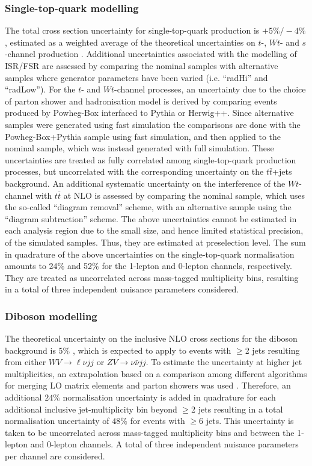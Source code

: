 \subsubsection{Single-top-quark modelling}
\label{sec:data:singletop}
The total cross section uncertainty for single-top-quark production is $+5\%/-4\%$, estimated as a weighted average of the theoretical uncertainties on $t$-, $Wt$- and $s$-channel production \cite{Kidonakis:2010ux,Kidonakis:2010tc,Kidonakis:2011wy}. Additional uncertainties associated with the modelling of ISR/FSR are assessed by comparing the nominal samples with alternative samples where generator parameters have been varied (i.e. ``radHi'' and ``radLow''). For the $t$- and $Wt$-channel processes, an uncertainty due to the choice of parton shower and hadronisation model is derived by comparing events produced by {\sc Powheg-Box} interfaced to {\sc Pythia} or {\sc Herwig++}. Since alternative samples were generated using fast simulation the comparisons are done with the {\sc Powheg-Box+Pythia} sample using fast simulation, and then applied to the nominal sample, which was instead generated with full simulation. These uncertainties are treated as fully correlated among single-top-quark production processes, but uncorrelated with the corresponding uncertainty on the $t\bar{t}$+jets background.
An additional systematic uncertainty on the interference of the $Wt$-channel with $t\bar{t}$ at NLO \cite{singletopDR} is assessed by comparing the nominal sample, which uses the so-called ``diagram removal'' scheme, with an alternative sample using the ``diagram subtraction'' scheme. 
The above uncertainties cannot be estimated in each analysis region due to the small size, and hence limited statistical precision, of the simulated samples. Thus, they are estimated at preselection level. 
The sum in quadrature of the above uncertainties on the single-top-quark normalisation amounts to 24\% and 52\% for the 1-lepton and 0-lepton channels, respectively.  They are treated as uncorrelated across mass-tagged multiplicity bins, resulting in a total of three independent nuisance parameters considered.

\subsubsection{Diboson modelling}
The theoretical uncertainty on the inclusive NLO cross sections for the diboson background is $5\%$ \cite{Campbell:1999ah}, which is expected to apply to events with $\ge$2 jets resulting from either $WV\to \ell \nu jj$ or $ZV \to \nu\bar{\nu}jj$. 
To estimate the uncertainty at higher jet multiplicities, an extrapolation based on a comparison among different algorithms for merging LO matrix elements and parton showers was used \cite{Alwall:2007fs}. Therefore, an additional $24\%$ normalisation uncertainty is added in quadrature for each additional inclusive jet-multiplicity bin beyond $\ge$2 jets resulting in a total normalisation uncertainty of $48\%$ for events with $\ge6$ jets. This uncertainty is taken to be uncorrelated across mass-tagged multiplicity bins and between the 1-lepton and 0-lepton channels. A total of three independent nuisance parameters per channel are considered.

